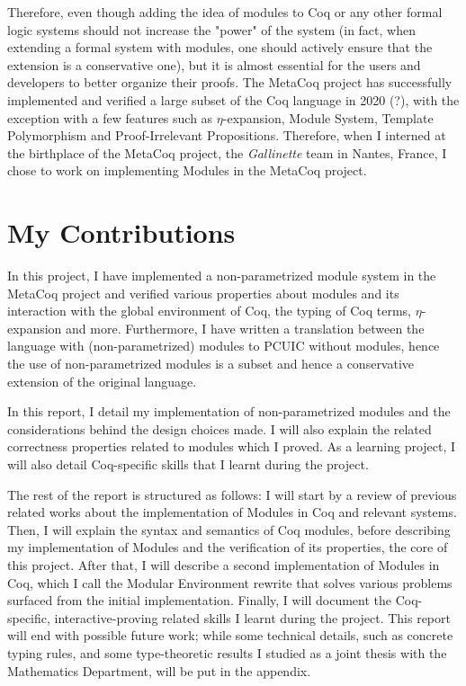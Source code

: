 Therefore, even though adding the idea of modules to Coq or any other formal
logic systems should not increase the "power" of the system (in fact, when
extending a formal system with modules, one should actively ensure that the
extension is a conservative one), but it is almost essential for the users and
developers to better organize their proofs. The MetaCoq project has successfully
implemented and verified a large subset of the Coq language in 2020 (?), with
the exception with a few features such as $\eta$-expansion, Module System, Template
Polymorphism and Proof-Irrelevant Propositions. Therefore, when I interned at
the birthplace of the MetaCoq project, the \emph{Gallinette} team in Nantes,
France, I chose to work on implementing Modules in the MetaCoq project.

\section{My Contributions}

In this project, I have implemented a non-parametrized module system in the
MetaCoq project and verified various properties about modules and its
interaction with the global environment of Coq, the typing of Coq terms,
$\eta$-expansion and more. Furthermore, I have written a translation between the
language with (non-parametrized) modules to PCUIC without modules, hence the use
of non-parametrized modules is a subset and hence a conservative extension of
the original language.

In this report, I detail my implementation of non-parametrized modules and the
considerations behind the design choices made. I will also explain the related
correctness properties related to modules which I proved. As a learning project,
I will also detail Coq-specific skills that I learnt during the project.

The rest of the report is structured as follows: I will start by a review of
previous related works about the implementation of Modules in Coq and relevant
systems. Then, I will explain the syntax and semantics of Coq modules, before
describing my implementation of Modules and the verification of its properties,
the core of this project. After that, I will describe a second implementation of
Modules in Coq, which I call the Modular Environment rewrite that solves various
problems surfaced from the initial implementation. Finally, I will document the
Coq-specific, interactive-proving related skills I learnt during the project.
This report will end with possible future work; while some technical details,
such as concrete typing rules, and some type-theoretic results I studied as a
joint thesis with the Mathematics Department, will be put in the appendix.